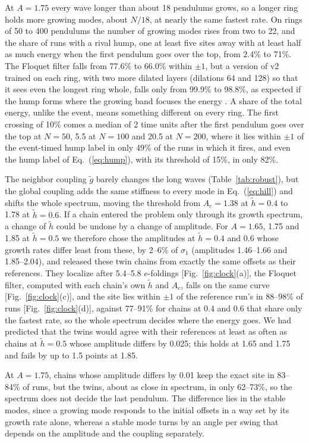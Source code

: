 \documentclass[11pt]{article}
\newcommand{\gt}{\tilde g}
\newcommand{\htl}{\tilde h}
\begin{document}
At $A=1.75$ every wave longer than about 18 pendulums grows, so a longer ring holds more growing modes, about $N/18$, at nearly the same fastest rate. On rings of 50 to 400 pendulums the number of growing modes rises from two to 22, and the share of runs with a rival hump, one at least five sites away with at least half as much energy when the first pendulum goes over the top, from 2.4\% to 71\%. The Floquet filter falls from 77.6\% to 66.0\% within $\pm1$, but a version of v2 trained on each ring, with two more dilated layers (dilations 64 and 128) so that it sees even the longest ring whole, falls only from 99.9\% to 98.8\%, as expected if the hump forms where the growing band focuses the energy \cite{kivshar1992modulational}. A share of the total energy, unlike the event, means something different on every ring. The first crossing of 10\% comes a median of 2 time units after the first pendulum goes over the top at $N=50$, 5.5 at $N=100$ and 20.5 at $N=200$, where it lies within $\pm1$ of the event-timed hump label in only 49\% of the runs in which it fires, and even the hump label of Eq.~(\ref{eq:hump}), with its threshold of 15\%, in only 82\%.

The neighbor coupling $\gt$ barely changes the long waves (Table~\ref{tab:robust}), but the global coupling adds the same stiffness to every mode in Eq.~(\ref{eq:hill}) and shifts the whole spectrum, moving the threshold from $A_c=1.38$ at $\htl=0.4$ to 1.78 at $\htl=0.6$. If a chain entered the problem only through its growth spectrum, a change of $\htl$ could be undone by a change of amplitude. For $A=1.65$, 1.75 and 1.85 at $\htl=0.5$ we therefore chose the amplitudes at $\htl=0.4$ and 0.6 whose growth rates differ least from these, by 2--6\% of $\sigma_1$ (amplitudes 1.46--1.66 and 1.85--2.04), and released these twin chains from exactly the same offsets as their references. They localize after 5.4--5.8 $e$-foldings [Fig.~\ref{fig:clock}(a)], the Floquet filter, computed with each chain's own $\htl$ and $A_c$, falls on the same curve [Fig.~\ref{fig:clock}(c)], and the site lies within $\pm1$ of the reference run's in 88--98\% of runs [Fig.~\ref{fig:clock}(d)], against 77--91\% for chains at 0.4 and 0.6 that share only the fastest rate, so the whole spectrum decides where the energy goes. We had predicted that the twins would agree with their references at least as often as chains at $\htl=0.5$ whose amplitude differs by 0.025; this holds at 1.65 and 1.75 and fails by up to 1.5 points at 1.85.

At $A=1.75$, chains whose amplitude differs by 0.01 keep the exact site in 83--84\% of runs, but the twins, about as close in spectrum, in only 62--73\%, so the spectrum does not decide the last pendulum. The difference lies in the stable modes, since a growing mode responds to the initial offsets in a way set by its growth rate alone, whereas a stable mode turns by an angle per swing that depends on the amplitude and the coupling separately.
\end{document}
